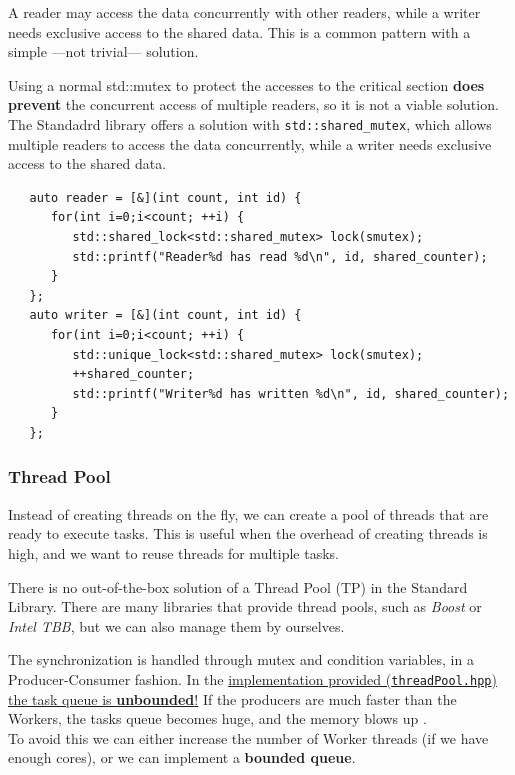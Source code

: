 A reader may access the data concurrently with
other readers, while a writer needs exclusive access to the shared data.
This is a common pattern with a simple  ---not trivial--- solution.

Using a normal std::mutex to protect the accesses to the critical section \textbf{does prevent} the concurrent access of multiple readers, so it is not a viable solution.
The Standadrd library offers a solution with \lstinline|std::shared_mutex|, which allows multiple readers to access the data concurrently, while a writer needs exclusive access to the shared data.

\begin{lstlisting}
   auto reader = [&](int count, int id) {
      for(int i=0;i<count; ++i) {
         std::shared_lock<std::shared_mutex> lock(smutex);
         std::printf("Reader%d has read %d\n", id, shared_counter);
      }
   };
   auto writer = [&](int count, int id) {
      for(int i=0;i<count; ++i) {
         std::unique_lock<std::shared_mutex> lock(smutex);
         ++shared_counter;
         std::printf("Writer%d has written %d\n", id, shared_counter);
      }
   };  
      \end{lstlisting}
   

\subsubsection{Thread Pool}
Instead of creating threads on the fly, we can create a pool of threads that are ready to execute tasks. This is useful when the overhead of creating threads is high, and we want to reuse threads for multiple tasks.

There is no out-of-the-box solution of a Thread Pool (TP) in the Standard Library. There are many libraries that provide thread pools, such as \textit{Boost} or \textit{Intel TBB}, but we can also manage them by ourselves.

The synchronization is handled through mutex and condition variables, in a Producer-Consumer fashion.
In the \ul{implementation provided (\texttt{threadPool.hpp}) the task queue is \textbf{unbounded}!}
If the producers are much faster than the Workers, the tasks queue becomes huge, and the memory blows up \frownie.\\
To avoid this we can either increase the number of Worker threads (if we have enough cores), or we can implement a \textbf{bounded queue}.
